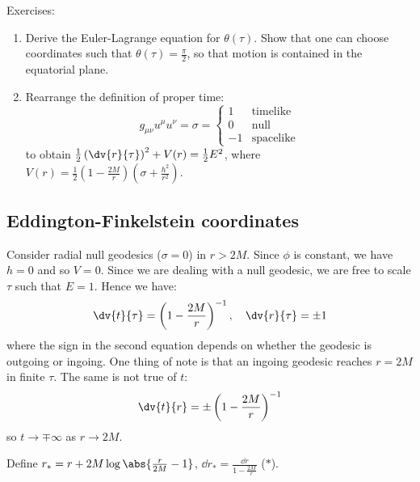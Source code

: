 \documentclass{jknotes}
\begin{document}
Exercises:
\begin{enumerate}
    \item Derive the Euler-Lagrange equation for \(\theta(\tau)\). Show that one can choose coordinates such that \(\theta(\tau) = \frac{\pi}{2}\), so that motion is contained in the equatorial plane.
    \item Rearrange the definition of proper time:
        \begin{equation}
            g_{\mu\nu}u^\mu u^\nu = \sigma = 
            \begin{cases}
                1 & \text{timelike}\\
                0 & \text{null}\\
                -1 & \text{spacelike}
            \end{cases}
        \end{equation}
        to obtain \(\frac{1}{2}\left( \dv{r}{\tau} \right)^2 + V(r) = \frac{1}{2}E^2\), where \(V(r) = \frac{1}{2}\left( 1-\frac{2M}{r} \right)\left( \sigma+\frac{h^2}{r^2} \right)\).
\end{enumerate}

\subsection{Eddington-Finkelstein coordinates}
Consider radial null geodesics (\(\sigma=0\)) in \(r>2M\). Since \(\phi\) is constant, we have \(h=0\) and so \(V=0\). Since we are dealing with a null geodesic, we are free to scale \(\tau\) such that \(E=1\). Hence we have:
\begin{equation}
    \dv{t}{\tau} = \left( 1-\frac{2M}{r} \right)^{-1}
    ,\quad
    \dv{r}{\tau} = \pm 1
\end{equation}
where the sign in the second equation depends on whether the geodesic is outgoing or ingoing. One thing of note is that an ingoing geodesic reaches \(r=2M\) in finite \(\tau\). The same is not true of \(t\):
\begin{equation}
    \dv{t}{r} = \pm\left( 1-\frac{2M}{r} \right)^{-1}
\end{equation}
so \(t\rightarrow\mp\infty\) as \(r\rightarrow2M\).

Define \(r_*=r+2M\log\abs{\frac{r}{2M}-1}\), \(\dd{r_*} = \frac{\dd{r}}{1 - \frac{2M}{r}}\) (\(*\)).
\end{document}
